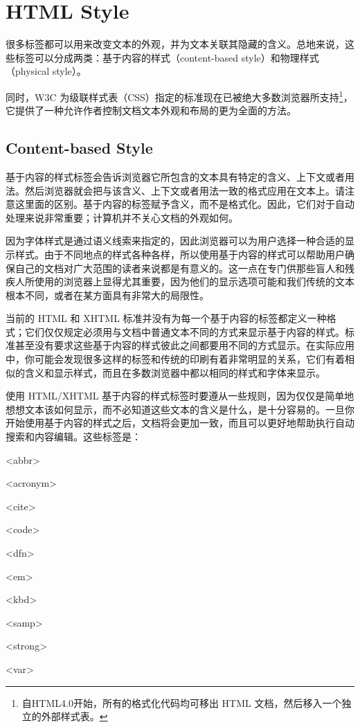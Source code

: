 \part{HTML Style}

很多标签都可以用来改变文本的外观，并为文本关联其隐藏的含义。总地来说，这些标签可以分成两类：基于内容的样式（content-based style）和物理样式（physical style）。

同时，W3C 为级联样式表（CSS）指定的标准现在已被绝大多数浏览器所支持\footnote{自HTML4.0开始，所有的格式化代码均可移出 HTML 文档，然后移入一个独立的外部样式表。}，它提供了一种允许作者控制文档文本外观和布局的更为全面的方法。

\chapter{Content-based Style}


基于内容的样式标签会告诉浏览器它所包含的文本具有特定的含义、上下文或者用法。然后浏览器就会把与该含义、上下文或者用法一致的格式应用在文本上。请注意这里面的区别。基于内容的标签赋予含义，而不是格式化。因此，它们对于自动处理来说非常重要；计算机并不关心文档的外观如何。

因为字体样式是通过语义线索来指定的，因此浏览器可以为用户选择一种合适的显示样式。由于不同地点的样式各种各样，所以使用基于内容的样式可以帮助用户确保自己的文档对广大范围的读者来说都是有意义的。这一点在专门供那些盲人和残疾人所使用的浏览器上显得尤其重要，因为他们的显示选项可能和我们传统的文本根本不同，或者在某方面具有非常大的局限性。

当前的 HTML 和 XHTML 标准并没有为每一个基于内容的标签都定义一种格式；它们仅仅规定必须用与文档中普通文本不同的方式来显示基于内容的样式。标准甚至没有要求这些基于内容的样式彼此之间都要用不同的方式显示。在实际应用中，你可能会发现很多这样的标签和传统的印刷有着非常明显的关系，它们有着相似的含义和显示样式，而且在多数浏览器中都以相同的样式和字体来显示。

使用 HTML/XHTML 基于内容的样式标签时要遵从一些规则，因为仅仅是简单地想想文本该如何显示，而不必知道这些文本的含义是什么，是十分容易的。一旦你开始使用基于内容的样式之后，文档将会更加一致，而且可以更好地帮助执行自动搜索和内容编辑。这些标签是：

\begin{compactitem}
\item <abbr>
\item <acronym>
\item <cite>
\item <code>
\item <dfn>
\item <em>
\item <kbd>
\item <samp>
\item <strong>
\item <var>
\end{compactitem}


